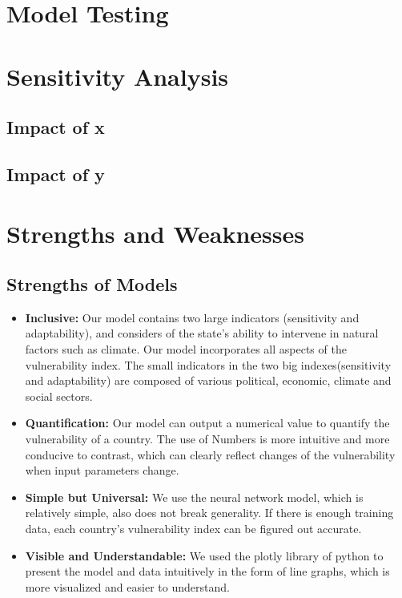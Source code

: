 \documentclass{mcmthesis}
\begin{document}
\section{Model Testing}

\section{Sensitivity Analysis}
\subsection{Impact of x}
\subsection{Impact of y}

\section{Strengths and Weaknesses}
\subsection{Strengths of Models}
\begin{itemize}
  \item \textbf{Inclusive:} Our model contains two large indicators (sensitivity and adaptability), and 
  considers of the state's ability to intervene in natural factors such as climate. 
  Our model incorporates all aspects of the vulnerability index. The small indicators 
  in the two big indexes(sensitivity and adaptability) are composed of various political, 
  economic, climate and social sectors.
  \item \textbf{Quantification:} Our model can output a numerical value to quantify the vulnerability of a country. 
  The use of Numbers is more intuitive and more conducive to contrast, which can clearly 
  reflect changes of the vulnerability when input parameters change.
  \item \textbf{Simple but Universal:} We use the neural network model, which is relatively simple, also does not break 
  generality. If there is enough training data, each country's vulnerability index 
  can be figured out  accurate.
  \item \textbf{Visible and Understandable:} We used the plotly library of python to present the model and data 
  intuitively in the form of line graphs, which is more visualized and 
  easier to understand.
\end{itemize}
\end{document}
